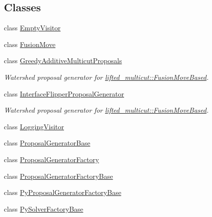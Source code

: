 \subsection*{Classes}
\begin{DoxyCompactItemize}
\item 
class \hyperlink{classnifty_1_1graph_1_1optimization_1_1common_1_1EmptyVisitor}{Empty\+Visitor}
\item 
class \hyperlink{classnifty_1_1graph_1_1optimization_1_1common_1_1FusionMove}{Fusion\+Move}
\item 
class \hyperlink{classnifty_1_1graph_1_1optimization_1_1common_1_1GreedyAdditiveMulticutProposals}{Greedy\+Additive\+Multicut\+Proposals}
\begin{DoxyCompactList}\small\item\em Watershed proposal generator for \hyperlink{classnifty_1_1graph_1_1optimization_1_1lifted__multicut_1_1FusionMoveBased}{lifted\+\_\+multicut\+::\+Fusion\+Move\+Based}. \end{DoxyCompactList}\item 
class \hyperlink{classnifty_1_1graph_1_1optimization_1_1common_1_1InterfaceFlipperProposalGenerator}{Interface\+Flipper\+Proposal\+Generator}
\begin{DoxyCompactList}\small\item\em Watershed proposal generator for \hyperlink{classnifty_1_1graph_1_1optimization_1_1lifted__multicut_1_1FusionMoveBased}{lifted\+\_\+multicut\+::\+Fusion\+Move\+Based}. \end{DoxyCompactList}\item 
class \hyperlink{classnifty_1_1graph_1_1optimization_1_1common_1_1LoggingVisitor}{Logging\+Visitor}
\item 
class \hyperlink{classnifty_1_1graph_1_1optimization_1_1common_1_1ProposalGeneratorBase}{Proposal\+Generator\+Base}
\item 
class \hyperlink{classnifty_1_1graph_1_1optimization_1_1common_1_1ProposalGeneratorFactory}{Proposal\+Generator\+Factory}
\item 
class \hyperlink{classnifty_1_1graph_1_1optimization_1_1common_1_1ProposalGeneratorFactoryBase}{Proposal\+Generator\+Factory\+Base}
\item 
class \hyperlink{classnifty_1_1graph_1_1optimization_1_1common_1_1PyProposalGeneratorFactoryBase}{Py\+Proposal\+Generator\+Factory\+Base}
\item 
class \hyperlink{classnifty_1_1graph_1_1optimization_1_1common_1_1PySolverFactoryBase}{Py\+Solver\+Factory\+Base}

\end{DoxyCompactItemize}
